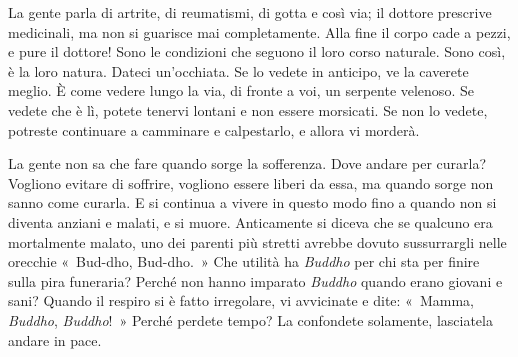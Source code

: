 La gente parla di artrite, di reumatismi, di gotta e così via; il
dottore prescrive medicinali, ma non si guarisce mai completamente. Alla
fine il corpo cade a pezzi, e pure il dottore! Sono le condizioni che
seguono il loro corso naturale. Sono così, è la loro natura. Dateci
un'occhiata. Se lo vedete in anticipo, ve la caverete meglio. È come
vedere lungo la via, di fronte a voi, un serpente velenoso. Se vedete
che è lì, potete tenervi lontani e non essere morsicati. Se non lo
vedete, potreste continuare a camminare e calpestarlo, e allora vi
morderà.

La gente non sa che fare quando sorge la sofferenza. Dove andare per
curarla? Vogliono evitare di soffrire, vogliono essere liberi da essa,
ma quando sorge non sanno come curarla. E si continua a vivere in questo
modo fino a quando non si diventa anziani e malati, e si muore.
Anticamente si diceva che se qualcuno era mortalmente malato, uno dei
parenti più stretti avrebbe dovuto sussurrargli nelle orecchie
«~Bud-dho, Bud-dho.~» Che utilità ha \emph{Buddho} per chi sta per
finire sulla pira funeraria? Perché non hanno imparato \emph{Buddho}
quando erano giovani e sani? Quando il respiro si è fatto irregolare, vi
avvicinate e dite: «~Mamma, \emph{Buddho}, \emph{Buddho}!~» Perché
perdete tempo? La confondete solamente, lasciatela andare in pace.

\enlargethispage{-\baselineskip}


